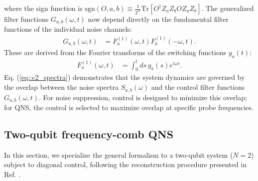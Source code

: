 \documentclass[%
 reprint,
superscriptaddress,
 amsmath,amssymb,
 aps,
pra,
]{revtex4-2}
\begin{document}
where the sign function is $\text{sgn}(O,a,b)\equiv\frac{1}{2^N}\text{Tr}\left[O^{\dagger}Z_aZ_bOZ_aZ_b\right]$.
The generalized filter functions $G_{a,b}(\omega,t)$ now depend directly on the fundamental filter functions of the individual noise channels:
\begin{align}
    G_{a,b}(\omega,t)&=F^{(1)}_{a}(\omega,t)F^{(1)}_{b}(-\omega,t).
\end{align}
These are derived from the Fourier transforms of the switching functions $y_a(t)$:
\begin{align}
    F_{a}^{(1)}(\omega, t)&=\int_0^t ds\,y_{a}(s)e^{i\omega s}.
\end{align}
Eq. (\ref{eq::c2_spectra}) demonstrates that the system dynamics are governed by the overlap between the noise spectra $S_{a,b}(\omega)$ and the control filter functions $G_{a,b}(\omega,t)$. For noise suppression, control is designed to minimize this overlap; for QNS, the control is selected to maximize overlap at specific probe frequencies.

\subsection{Two-qubit frequency-comb QNS}
\label{sec::FCQNS}
In this section, we specialize the general formalism to a two-qubit system ($N=2$) subject to diagonal control, following the reconstruction procedure presented in Ref. \cite{PhysRevA.95.022121}.
\end{document}
